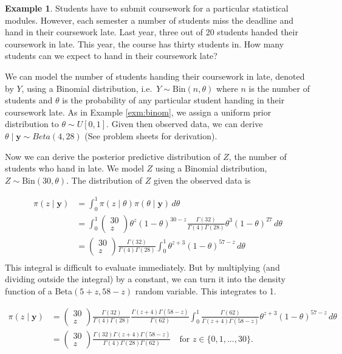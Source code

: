 \documentclass[
]{book}
\theoremstyle{definition}
\theoremstyle{definition}
\newtheorem{example}{Example}[chapter]
\theoremstyle{definition}
\theoremstyle{definition}
\theoremstyle{remark}
\begin{document}
\begin{example}

Students have to submit coursework for a particular statistical modules. However, each semester a number of students miss the deadline and hand in their coursework late. Last year, three out of 20 students handed their coursework in late. This year, the course has thirty students in. How many students can we expect to hand in their coursework late?

We can model the number of students handing their coursework in late, denoted by \(Y\), using a Binomial distribution, i.e.~\(Y \sim \textrm{Bin}(n, \theta)\) where \(n\) is the number of students and \(\theta\) is the probability of any particular student handing in their coursework late. As in Example \ref{exm:binom}, we assign a uniform prior distribution to \(\theta \sim U[0, 1]\). Given then observed data, we can derive \(\theta \mid \boldsymbol{y} \sim Beta(4, 28)\) (See problem sheets for derivation).

Now we can derive the posterior predictive distribution of \(Z\), the number of students who hand in late. We model \(Z\) using a Binomial distribution, \(Z \sim \textrm{Bin}(30, \theta)\). The distribution of \(Z\) given the observed data is

\begin{align*}
\pi(z \mid \boldsymbol{y}) &= \int_0^1 \pi(z \mid \theta) \pi(\theta \mid \boldsymbol{y})\, d\theta \\
& = \int_0^1 \begin{pmatrix} 30 \\ z \end{pmatrix} \theta^z (1-\theta)^{30 - z} \frac{\Gamma(32)}{\Gamma(4)\Gamma(28)}\theta^{3}(1-\theta)^{27}\, d\theta \\
 & = \begin{pmatrix} 30 \\ z \end{pmatrix}\frac{\Gamma(32)}{\Gamma(4)\Gamma(28)}\int_0^1 \theta^{z + 3}(1-\theta)^{57 - z}\, d\theta \\
\end{align*}
This integral is difficult to evaluate immediately. But by multiplying (and dividing outside the integral) by a constant, we can turn it into the density function of a Beta\((5 + z, 58 - z)\) random variable. This integrates to 1.

\begin{align*}
\pi(z \mid \boldsymbol{y})  & = \begin{pmatrix} 30 \\ z \end{pmatrix}\frac{\Gamma(32)}{\Gamma(4)\Gamma(28)}\frac{\Gamma(z+4)\Gamma(58-z)}{\Gamma(62)}\int_0^1 \frac{\Gamma(62)}{\Gamma(z+4)\Gamma(58-z)}\theta^{z + 3}(1-\theta)^{57 - z}\, d\theta \\ 
& = \begin{pmatrix} 30 \\ z \end{pmatrix}\frac{\Gamma(32)\Gamma(z+4)\Gamma(58-z)}{\Gamma(4)\Gamma(28)\Gamma(62)} \quad \textrm{for }  z \in \{0,1,...,30 \}.
\end{align*}


\end{example}
\end{document}
